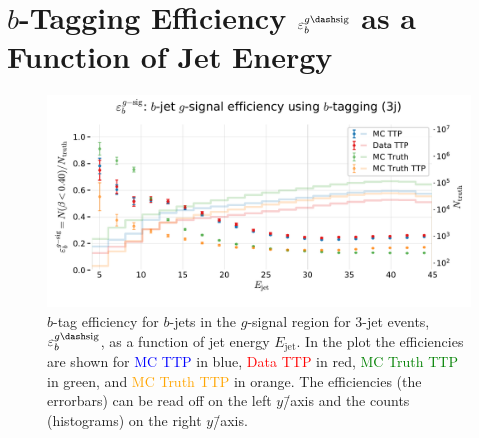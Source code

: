 \section[b-tag Efficiency for b-Jets in the g-Signal Region for 3-jet events]{$b$-Tagging Efficiency $\varepsilon_b^{g\dash\mathrm{sig}}$ as a Function of Jet Energy}
\begin{figure}
  \centerfloat
  \includegraphics[width=1\textwidth, trim=20 30 0 40, clip]{figures/quarks/eff_b_gsig-down_sample=1.00-ML_vars=vertex-selection=b-ejet_min=4-n_iter_RS_lgb=99-n_iter_RS_xgb=9-cdot_cut=0.90-version=19.pdf}
  \caption[$b$-Tagging Efficiency $\varepsilon_b^{g\dash\mathrm{sig}}$ as a Function of Jet Energy]
          {$b$-tag efficiency for $b$-jets in the $g$-signal region for 3-jet events, $\varepsilon_b^{g\dash\mathrm{sig}}$, as a function of jet energy $E_\mathrm{jet}$. In the plot the efficiencies are shown for \textcolor{blue}{MC TTP} in blue, \textcolor{red}{Data TTP} in red, \textcolor{green}{MC Truth TTP} in green, and \textcolor{orange}{MC Truth TTP} in orange. The efficiencies (the errorbars) can be read off on the left $y$\=/axis and the counts (histograms) on the right $y$\=/axis.} 
  \label{fig:q:effiency_btag_bjet_gsig}
\end{figure}
\vspace{3cm}
